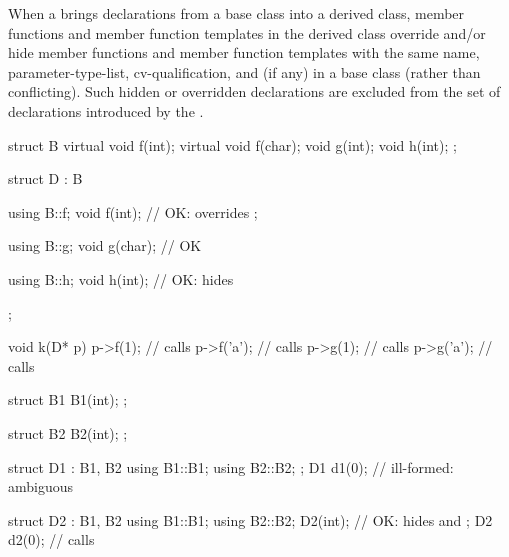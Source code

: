 \pnum
{}%
When a  brings declarations from a base class into
a derived class, member functions and member function templates in
the derived class override and/or hide member functions and member
function templates with the same name,
parameter-type-list, cv-qualification, and  (if any) in a base
class (rather than conflicting).
Such hidden or overridden declarations are excluded from the set of
declarations introduced by the .
\begin{example}

\begin{codeblock}
struct B {
  virtual void f(int);
  virtual void f(char);
  void g(int);
  void h(int);
};

struct D : B {
  using B::f;
  void f(int);      // OK:  overrides ;

  using B::g;
  void g(char);     // OK

  using B::h;
  void h(int);      // OK:  hides 
};

void k(D* p)
{
  p->f(1);          // calls 
  p->f('a');        // calls 
  p->g(1);          // calls 
  p->g('a');        // calls 
}

struct B1 {
  B1(int);
};

struct B2 {
  B2(int);
};

struct D1 : B1, B2 {
  using B1::B1;
  using B2::B2;
};
D1 d1(0);           // ill-formed: ambiguous

struct D2 : B1, B2 {
  using B1::B1;
  using B2::B2;
  D2(int);          // OK:  hides  and 
};
D2 d2(0);           // calls 
\end{codeblock}
\end{example}

